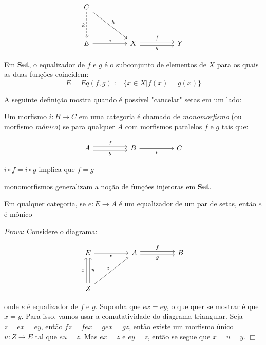 \documentclass[../main.tex]{subfiles}
\begin{document}
\[\begin{tikzcd}
	C \\
	\\
	E && X && Y
	\arrow["k"', dashed, from=1-1, to=3-1]
	\arrow["h", from=1-1, to=3-3]
	\arrow["e", from=3-1, to=3-3]
	\arrow["g"', shift right, from=3-3, to=3-5]
	\arrow["f", shift left, from=3-3, to=3-5]
\end{tikzcd}\]

Em \textbf{Set}, o equalizador de $f$ e $g$ é o subconjunto de elementos de $X$ para os quais as duas funções coincidem: $$E = Eq(f, g) := \{x \in X | f(x) = g(x)\}$$

A seguinte definição mostra quando é possível "cancelar" setas em um lado:

\begin{definition}
    Um morfismo $i : B \to C$ em uma categoria é chamado de \emph{monomorfismo} (ou morfismo \emph{mônico}) se para qualquer $A$ com morfismos paralelos $f$ e $g$ tais que:

    \[\begin{tikzcd}
        A && B && C
        \arrow["g"', shift right, from=1-1, to=1-3]
        \arrow["f", shift left, from=1-1, to=1-3]
        \arrow["i"', from=1-3, to=1-5]
    \end{tikzcd}\]

    $i \circ f = i \circ g$ implica que $f = g$
\end{definition}

monomorfismos generalizam a noção de funções injetoras em \textbf{Set}.

\begin{proposition}
    Em qualquer categoria, se $e : E \to A$ é um equalizador de um par de setas, então $e$ é mônico
\end{proposition}

\emph{Prova}: Considere o diagrama:

\[\begin{tikzcd}
	E && A && B \\
	\\
	Z
	\arrow["e"', from=1-1, to=1-3]
	\arrow["g"', shift right, from=1-3, to=1-5]
	\arrow["f", shift left, from=1-3, to=1-5]
	\arrow["x", shift left, from=3-1, to=1-1]
	\arrow["y"', shift right, from=3-1, to=1-1]
	\arrow["z", from=3-1, to=1-3]
\end{tikzcd}\]

onde $e$ é equalizador de $f$ e $g$. Suponha que $ex = ey$, o que quer se mostrar é que $x = y$. Para isso, vamos usar a comutatividade do diagrama triangular. Seja $z = ex = ey$, então $fz = fex = gex = gz$, então existe um morfismo único $u : Z \to E$ tal que $eu = z$. Mas $ex = z$ e $ey = z$, então se segue que $x = u = y$. $\Box $
\end{document}

